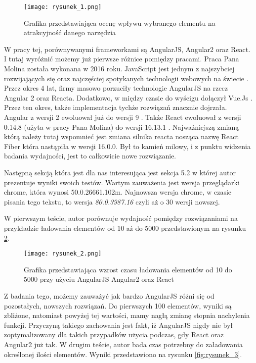 \begin{figure}[!ht]
    \centering
    \texttt{[image: rysunek\_1.png]}
    \caption{Grafika przedstawiająca ocenę wpływu wybranego elementu na atrakcyjność danego narzędzia \cite{Molin}}
    \label{fig:rysunek_1}
\end{figure}




W pracy tej, porównywanymi frameworkami są AngularJS, Angular2 oraz React.
I tutaj wyróżnić możemy już pierwsze różnice pomiędzy pracami. Praca Pana Molina została wykonana w 2016 roku.
JavaScript jest jednym z najszybciej rozwijających  się oraz najczęściej spotykanych technologii webowych na świecie \cite{octoverse}.
Przez okres 4 lat, firmy masowo porzuciły technologie AngularJS na rzecz Angular 2 oraz Reacta.
Dodatkowo, w między czasie do wyścigu dołączył Vue.Js \cite{vue}.
Przez ten okres, także implementacja tychże rozwiązań znacznie dojrzała.
Angular z wersji 2 ewoluował już do wersji 9 \cite{angular-changelog}.
Także React ewoluował z wersji 0.14.8 (użyta w pracy  Pana Molina) do wersji 16.13.1 \cite{react-changelog}.
Najważniejszą zmianą którą należy tutaj wspomnieć jest zmiana silnika reacta nosząca nazwę React Fiber która nastąpiła w wersji 16.0.0.
Był to kamień milowy, i z punktu widzenia badania wydajności, jest to całkowicie nowe rozwiązanie. 

Następną sekcją która jest dla nas interesująca jest sekcja 5.2 w której autor prezentuje wyniki swoich testów.
Wartym zauważenia jest wersja przeglądarki chrome, która wynosi 50.0.26661.102m.
Najnowsza wersja chrome, w czasie pisania tego tekstu, to wersja \textit{80.0.3987.16} czyli aż o 30 wersji nowszej. 

W pierwszym teście, autor porównuje wydajność pomiędzy rozwiązaniami na przykładzie ładowania elementów od 10 aż do 5000 przedstawionym na rysunku \ref{fig:rysunek_2}.

\begin{figure}[!ht]
    \centering
    \texttt{[image: rysunek\_2.png]}
    \caption{Grafika przedstawiająca wzrost czasu ładowania elementów od 10 do 5000 przy użyciu AngularJS Angular2 oraz React \cite{Molin}}
    \label{fig:rysunek_2}
\end{figure}

Z badania tego, możemy zauważyć jak bardzo AngularJS różni się od pozostałych, nowszych rozwiązań. Do pierwszych 100 elementów, wyniki są zbliżone, natomiast powyżej tej wartości, mamy nagłą zmianę stopnia nachylenia funkcji. Przyczyną takiego zachowania jest fakt, iż AngularJS nigdy nie był zoptymalizowany dla takich przypadków użycia podczas, gdy React oraz Angular2 już tak.
W drugim teście, autor bada czas potrzebny do załadowania określonej ilości elementów. Wyniki przedstawiono na rysunku \ref{fig:rysunek_3}.

